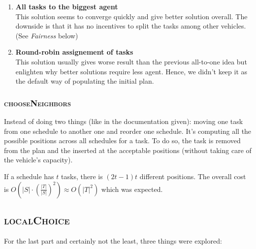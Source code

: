 \documentclass[11pt,a4paper]{article}
\begin{document}
\begin{enumerate}
    \item \textbf{All tasks to the biggest agent}\\
        This solution seems to converge quickly and give better solution
        overall. The downside is that it has no incentives to split the tasks
        among other vehicles. (See \emph{Fairness} below)

    \item \textbf{Round-robin assignement of tasks}\\
        This solution usually gives worse result than the previous all-to-one
        idea but enlighten why better solutions require less agent. Hence, we
        didn't keep it as the default way of populating the initial plan.

\end{enumerate}


\subsubsection*{\textsc{chooseNeighbors}}

Instead of doing two things (like in the documentation given): moving one task
from one schedule to another one and reorder one schedule. It's computing all
the possible positions across all schedules for a task. To do so, the task is
removed from the plan and the inserted at the acceptable positions (without
taking care of the vehicle's capacity).

If a schedule has $t$ tasks, there is $(2t - 1)t$ different positions. The
overall cost is $O(|S| \cdot (\frac{|T|}{|S|})^2) \approx O(|T|^2)$ which was
expected.


\subsection*{\textsc{localChoice}}

For the last part and certainly not the least, three things were explored:
\end{document}
